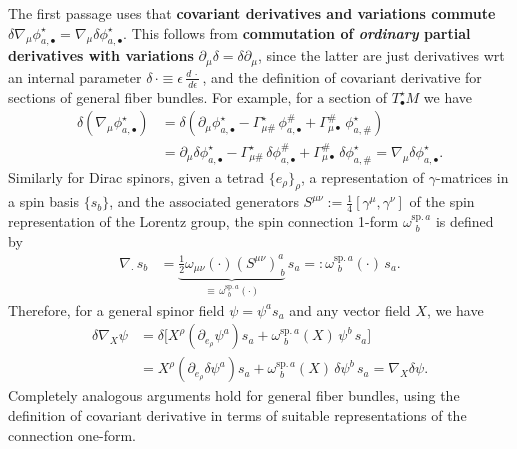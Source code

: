 \documentclass[../geometry_main.tex]{subfiles}
\begin{document}
\begin{mytheorem}
The first passage uses that \textbf{covariant derivatives and variations commute} { $\delta \nabla_\mu \phi^\star_{a,\bullet} = \nabla_\mu \delta \phi^\star_{a,\bullet}$.}
This follows from \textbf{commutation of \emph{ordinary} partial derivatives with variations} $\partial_\mu \delta=\delta\partial_\mu$, since the latter are just derivatives wrt an internal parameter $\delta\,\cdot \equiv \epsilon\, \frac{d\,\cdot}{d\epsilon}\,$, and the definition of covariant derivative for sections of general fiber bundles.
For example, for a section of $T^\star_\bullet M$ we have
\begin{align}
    \delta (\nabla_\mu \phi^\star_{a,\bullet})
    &= \delta \left( \partial_\mu \phi^\star_{a,\bullet} -\Gamma_{\mu \#}^\star \,\phi^{\#}_{a,\bullet} + \Gamma_{\mu\bullet}^{\#}\,\phi^\star_{a,\#}\right)
    \\
    &= \partial_\mu \delta \phi^\star_{a,\bullet} - \Gamma_{\mu \#}^\star \,\delta \phi^{\#}_{a,\bullet} + \Gamma_{\mu\bullet}^{\#}\,\delta \phi^\star_{a,\#}
    = \nabla_\mu \delta \phi^\star_{a,\bullet}.
\end{align}
%
Similarly for Dirac spinors, given a tetrad $\{e_\rho\}_\rho$, a representation of $\gamma$-matrices in a spin basis $\{s_b\}$, and the associated generators $S^{\mu\nu}:=\frac{1}{4}[\gamma^\mu,\gamma^\nu]$ of the spin representation of the Lorentz group, the spin connection 1-form $\omega^{\mathrm{sp.\,}a}_{\,~b}$ is defined by
\begin{align}
    \nabla_{\cdot}\, s_b &=  \underbrace{\tfrac{1}{2}\omega_{\mu\nu}(\cdot) \left(S^{\mu\nu}\right)^a_{~b}}_{\equiv \,\omega^{\mathrm{sp.\,}a}_{\,~b}(\cdot)}\,  s_a =: \omega^{\mathrm{sp.\,}a}_{\,~b}(\cdot)\, s_a.
\end{align}
Therefore, for a general spinor field $\psi=\psi^a s_a$ and any vector field $X$, we have
\begin{align}
    \delta \nabla_{X} \psi 
    &= \delta \Big[ X^\rho \left(\partial_{e_\rho} \psi^a\right) s_a + \omega^{\mathrm{sp.\,}a}_{\,~b}(X)\, \psi^b\, s_a\Big]
    \\
    &= X^\rho \left(\partial_{e_\rho} \delta \psi^a\right) s_a + \omega^{\mathrm{sp.\,}a}_{\,~b}(X)\, \delta \psi^b\, s_a
    = \nabla_X \delta \psi.
\end{align}
%
Completely analogous arguments hold for general fiber bundles, using the definition of covariant derivative in terms of suitable representations of the connection one-form.
 


\end{mytheorem}
\end{document}
